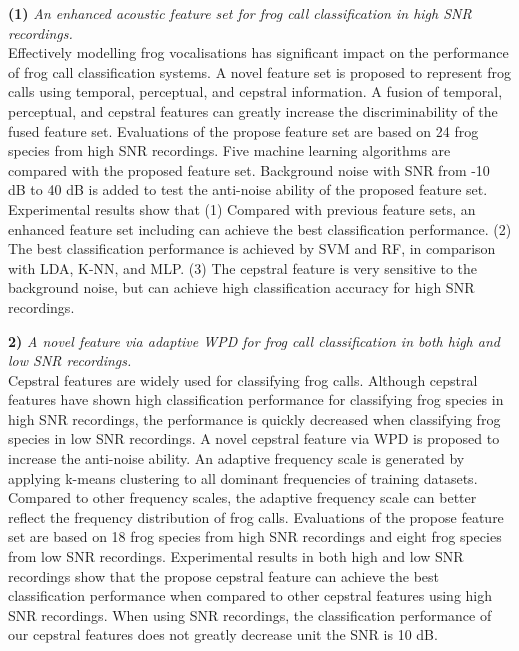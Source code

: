 \textbf{(1)} \textit{An enhanced acoustic feature set for frog call classification in high SNR recordings.} 
\\
Effectively modelling frog vocalisations has significant impact on the performance of frog call classification systems. A novel feature set is proposed to represent frog calls using temporal, perceptual, and cepstral information. A fusion of temporal, perceptual, and cepstral features can greatly increase the discriminability of the fused feature set. Evaluations of the propose feature set are based on 24 frog species from high SNR recordings. Five machine learning algorithms are compared with the proposed feature set. Background noise with SNR from -10 dB to 40 dB is added to test the anti-noise ability of the proposed feature set. Experimental results show that (1) Compared with previous feature sets, an enhanced feature set including  can achieve the best classification performance. (2) The best classification performance is achieved by SVM and RF, in comparison with LDA, K-NN, and MLP. (3) The cepstral feature is very sensitive to the background noise, but can achieve high classification accuracy for high SNR recordings. 

\textbf{2)} \textit{A novel feature via adaptive WPD for frog call classification in both high and low SNR recordings.}
\\
Cepstral features are widely used for classifying frog calls. Although cepstral features have shown high classification performance for classifying frog species in high SNR recordings, the performance is quickly decreased when classifying frog species in low SNR recordings. A novel cepstral feature via WPD is proposed to increase the anti-noise ability. An adaptive frequency scale is generated by applying k-means clustering to all dominant frequencies of training datasets. Compared to other frequency scales, the adaptive frequency scale can better reflect the frequency distribution of frog calls. Evaluations of the propose feature set are based on 18 frog species from high SNR recordings and eight frog species from low SNR recordings. Experimental results in both high and low SNR recordings show that the propose cepstral feature can achieve the best classification performance when compared to other cepstral features using high SNR recordings. When using SNR recordings, the classification performance of our cepstral features does not greatly decrease unit the SNR is 10 dB.



